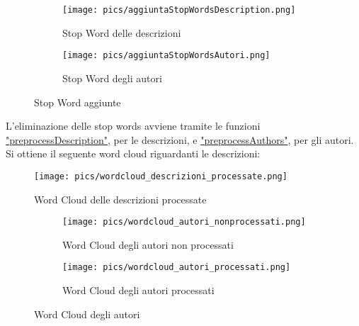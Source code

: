 \documentclass[12pt,oneside]{article}
\begin{document}
\begin{enumerate}
    \begin{figure}[H]
    \begin{subfigure}{0.15\textwidth}
    \texttt{[image: pics/aggiuntaStopWordsDescription.png]} 
    \begin{justify}
    \caption{Stop Word delle descrizioni}  
    \end{justify}
    \label{fig:subim1}
    \end{subfigure}
    \hspace{3cm}
    \begin{subfigure}{0.17\textwidth}
    \texttt{[image: pics/aggiuntaStopWordsAutori.png]}
    \begin{justify}
    \caption{Stop Word degli autori}   
    \end{justify}
    \label{fig:subim2}
    \end{subfigure}
    \caption{Stop Word aggiunte}
    \end{figure}

    \newpage
    \begin{justify}
    L'eliminazione delle stop words avviene tramite le funzioni \hyperlink{preD}{"preprocessDescription"}, per le descrizioni, e \hyperlink{preA}{"preprocessAuthors"}, per gli autori. Si ottiene il seguente word cloud riguardanti le descrizioni:
    \end{justify}
    \begin{figure}[H]
    \centering
    \texttt{[image: pics/wordcloud\_descrizioni\_processate.png]}
    \caption{Word Cloud delle descrizioni processate}
    \end{figure}

    \hfill
    \hfill
    \begin{figure}[H]
    \begin{subfigure}{0.48\textwidth}
    \texttt{[image: pics/wordcloud\_autori\_nonprocessati.png]} 
    \caption{Word Cloud degli autori non processati}
    \label{fig:subim1}
    \end{subfigure}
    \begin{subfigure}{0.48\textwidth}
    \texttt{[image: pics/wordcloud\_autori\_processati.png]}
    \caption{Word Cloud degli autori processati}
    \label{fig:subim2}
    \end{subfigure}
    \caption{Word Cloud degli autori}
    \end{figure}
    \end{enumerate}
\end{document}
